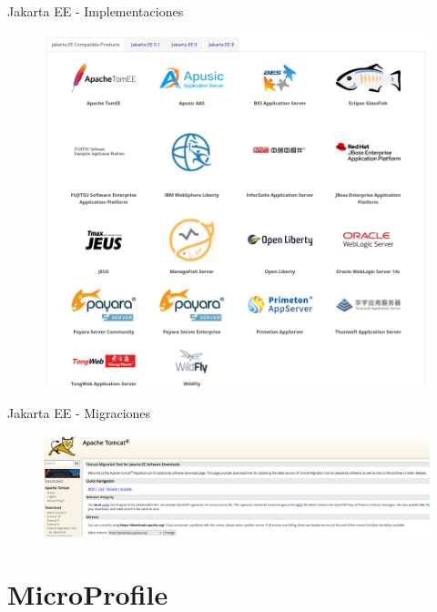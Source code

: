 \documentclass[aspectratio=169]{beamer}
\begin{document}
\begin{frame}{Jakarta EE - Implementaciones}
\begin{figure}
	\centering
	\includegraphics[width=0.7\linewidth]{Images/jakartaeeimplementations}
\end{figure}
\end{frame}
\begin{frame}{Jakarta EE - Migraciones}
\begin{figure}
	\centering
	\includegraphics[width=\linewidth]{Images/migration}
\end{figure}
\end{frame}


{
    \section{MicroProfile}
}
\end{document}
